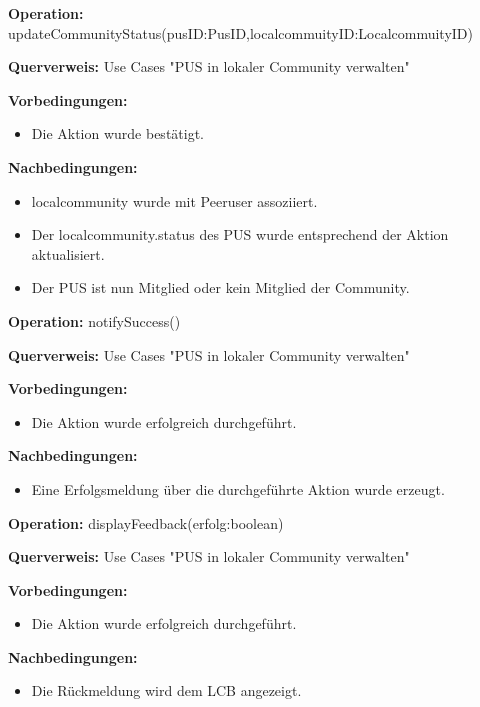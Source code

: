 \documentclass[a4paper,12pt]{article}
\begin{document}
	\begin{contractbox}
		\textbf{Operation:} updateCommunityStatus(pusID:PusID,localcommuityID:LocalcommuityID)
		
		\textbf{Querverweis:} Use Cases "PUS in lokaler Community verwalten"
		
		\textbf{Vorbedingungen:}
		\begin{itemize}[noitemsep]
			\item Die Aktion wurde bestätigt.
		\end{itemize}
		
		\textbf{Nachbedingungen:}
		\begin{itemize}[noitemsep]
			\item localcommunity wurde mit Peeruser assoziiert. 
			\item Der localcommunity.status des PUS wurde entsprechend der Aktion aktualisiert.
			\item Der PUS ist nun Mitglied oder kein Mitglied der Community.
		\end{itemize}
	\end{contractbox}
	
	
	\begin{contractbox}
		\textbf{Operation:} notifySuccess()
		
		\textbf{Querverweis:} Use Cases "PUS in lokaler Community verwalten"
		
		\textbf{Vorbedingungen:}
		\begin{itemize}[noitemsep]
			\item Die Aktion wurde erfolgreich durchgeführt.
		\end{itemize}
		
		\textbf{Nachbedingungen:}
		\begin{itemize}[noitemsep]
			\item Eine Erfolgsmeldung über die durchgeführte Aktion wurde erzeugt.
		\end{itemize}
	\end{contractbox}
	
	\begin{contractbox}
		\textbf{Operation:} displayFeedback(erfolg:boolean)
		
		\textbf{Querverweis:} Use Cases "PUS in lokaler Community verwalten"
		
		\textbf{Vorbedingungen:}
		\begin{itemize}[noitemsep]
			\item Die Aktion wurde erfolgreich durchgeführt.
		\end{itemize}
		
		\textbf{Nachbedingungen:}
		\begin{itemize}[noitemsep]
			\item Die Rückmeldung wird dem LCB angezeigt.
		\end{itemize}
	\end{contractbox}
	
\end{document}
